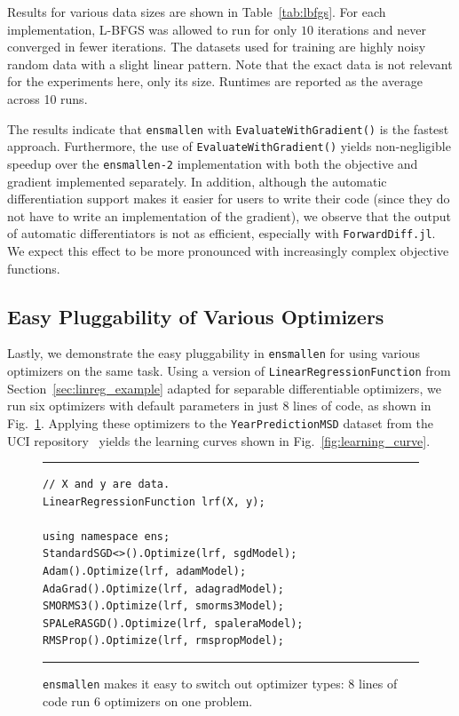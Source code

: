 Results for various data sizes are shown in Table~\ref{tab:lbfgs}.  For each
implementation, L-BFGS was allowed to run for only $10$ iterations and never
converged in fewer iterations.  The datasets used for training are highly noisy random
data with a slight linear pattern. Note that the exact data is not relevant
for the experiments here, only its size.  Runtimes are reported as the
average across 10 runs.

The results indicate that \texttt{ensmallen} with
\texttt{EvaluateWithGradient()} is the fastest approach.
Furthermore, the use of \texttt{EvaluateWithGradient()} yields
non-negligible speedup over the \texttt{ensmallen-2} implementation with
both the objective and gradient implemented separately.  In addition, although
the automatic differentiation support makes it easier for users to write their
code (since they do not have to write an implementation of the gradient), we
observe that the output of automatic differentiators is not as efficient,
especially with \texttt{ForwardDiff.jl}.  We expect this effect to be
more pronounced with increasingly complex objective functions.

\subsection{Easy Pluggability of Various Optimizers}

Lastly, we demonstrate the easy pluggability in \texttt{ensmallen}
for using various optimizers on the same task.
Using a version of {\tt LinearRegressionFunction} from
Section~\ref{sec:linreg_example} adapted for separable differentiable
optimizers, we run six optimizers with default parameters in just 8 lines of
code, as shown in Fig.~\ref{fig:learning_curve_code}.
Applying these optimizers to the \texttt{YearPredictionMSD}
dataset from the UCI repository~\cite{ucimlrepository}
yields the learning curves shown in Fig.~\ref{fig:learning_curve}.

\begin{figure}[t!]
\hrule
\vspace{1ex}
\begin{verbatim}
// X and y are data.
LinearRegressionFunction lrf(X, y);

using namespace ens;
StandardSGD<>().Optimize(lrf, sgdModel);
Adam().Optimize(lrf, adamModel);
AdaGrad().Optimize(lrf, adagradModel);
SMORMS3().Optimize(lrf, smorms3Model);
SPALeRASGD().Optimize(lrf, spaleraModel);
RMSProp().Optimize(lrf, rmspropModel);
\end{verbatim}
\hrule
\vspace*{-0.5em}
\caption{{\tt ensmallen} makes it easy to switch out optimizer types:
8 lines of code run 6 optimizers on one problem.}
\label{fig:learning_curve_code}
\end{figure}

